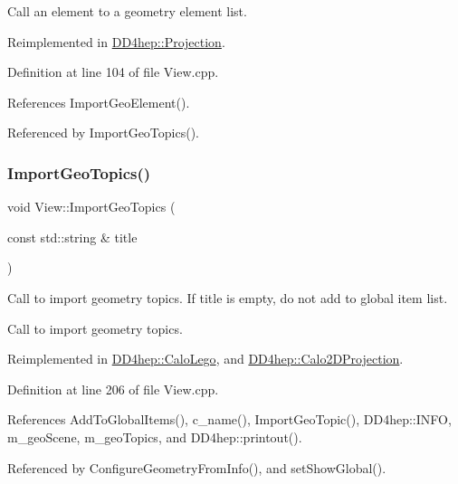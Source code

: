 Call an element to a geometry element list. 



Reimplemented in \hyperlink{class_d_d4hep_1_1_projection_a97415addc63b3253bbccc3bcd0414c26}{D\+D4hep\+::\+Projection}.



Definition at line 104 of file View.\+cpp.



References Import\+Geo\+Element().



Referenced by Import\+Geo\+Topics().

\hypertarget{class_d_d4hep_1_1_view_abd144de401f8a410789c497f44161330}{}\label{class_d_d4hep_1_1_view_abd144de401f8a410789c497f44161330} 
\subsubsection{\texorpdfstring{Import\+Geo\+Topics()}{ImportGeoTopics()}}
{\footnotesize\ttfamily void View\+::\+Import\+Geo\+Topics (\begin{DoxyParamCaption}\item[{const std\+::string \&}]{title }\end{DoxyParamCaption})\hspace{0.3cm}{\ttfamily [virtual]}}



Call to import geometry topics. If title is empty, do not add to global item list. 

Call to import geometry topics. 

Reimplemented in \hyperlink{class_d_d4hep_1_1_calo_lego_a0d62d7d45cb1935651cbc9fc2d37af57}{D\+D4hep\+::\+Calo\+Lego}, and \hyperlink{class_d_d4hep_1_1_calo2_d_projection_af922fcd5265dc3bdbab79ce228cbc6aa}{D\+D4hep\+::\+Calo2\+D\+Projection}.



Definition at line 206 of file View.\+cpp.



References Add\+To\+Global\+Items(), c\+\_\+name(), Import\+Geo\+Topic(), D\+D4hep\+::\+I\+N\+FO, m\+\_\+geo\+Scene, m\+\_\+geo\+Topics, and D\+D4hep\+::printout().



Referenced by Configure\+Geometry\+From\+Info(), and set\+Show\+Global().

